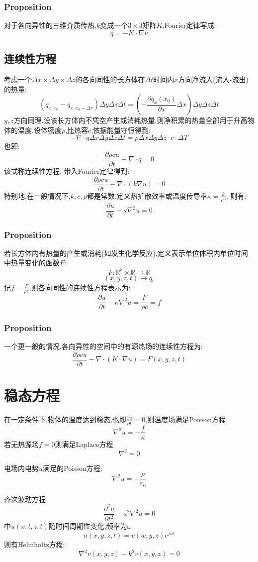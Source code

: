 \documentclass[12pt, a4paper, oneside]{ctexbook}
\newcommand{\pian }{\partial}%
\newcommand{\R }{\mathbb{R}}%
\begin{document}
\subsubsection{Proposition}
对于各向异性的三维介质传热,$k$变成一个$3\times 3$矩阵$K$,Fourier定律写成:
$$
q=-K\cdot \nabla u
$$
\subsection{连续性方程}
考虑一个$\Delta x\times \Delta y\times \Delta z$的各向同性的长方体在$\Delta t$时间内$x$方向净流入(流入-流出)的热量:
$$
  (q_{x,x_0}-q_{x,x_0+\Delta x})\Delta y\Delta z \Delta t=(-\frac{\pian q_x(x_0)}{\pian x}\Delta x )\Delta y \Delta z \Delta t
$$
$y,z$方向同理.设该长方体内不凭空产生或消耗热量,则净积累的热量全部用于升高物体的温度.设体密度$\rho$,比热容$c$,依据能量守恒得到:
$$
  -\nabla \cdot q \Delta x\Delta y \Delta z \Delta t=\rho \Delta x\Delta y \Delta z\cdot c\cdot \Delta T
$$
也即:
$$
  \frac{\pian \rho c u}{\pian t}+\nabla \cdot q=0
$$
该式称连续性方程.
带入Fourier定律得到:
$$
  \frac{\pian \rho c u}{\pian t}-\nabla \cdot (k\nabla u)=0
$$
特别地,在一般情况下,$k,c,\rho$都是常数.定义热扩散效率或温度传导率$\kappa =\frac{k}{\rho c}$,
则有:
$$
  \frac{\pian u}{\pian t}-\kappa\nabla^2 u=0
$$
\subsubsection{Proposition}
若长方体内有热量的产生或消耗(如发生化学反应),定义表示单位体积内单位时间中热量变化的函数$F$:
$$
  F:\R^3\times \R\rightarrow \R
$$
$$
  (x,y,z,t)\mapsto q_r
$$
记$f=\frac{F}{\rho c}$,则各向同性的连续性方程表示为:
$$
  \frac{\pian u}{\pian t}-\kappa\nabla^2 u=\frac{F}{\rho c}=f
$$
\subsubsection{Proposition}
一个更一般的情况,各向异性的空间中的有源热场的连续性方程为:
$$
  \frac{\pian \rho c u}{\pian t}-\nabla \cdot (K\cdot \nabla u)=F(x,y,z,t)
$$
\section{稳态方程}
在一定条件下,物体的温度达到稳态,也即$\frac{\pian u}{\pian t}=0$,则温度场满足Poisson方程
$$
  \nabla^2u=-\frac{f}{\kappa}
$$
若无热源场$f=0$则满足Laplace方程
$$
  \nabla^2=0
$$

电场内电势$u$满足的Poisson方程:
$$
  \nabla^2u=-\frac{\rho }{\varepsilon_0}
$$

齐次波动方程
$$
    \frac{\pian^2 u}{\pian t^2}-a^2\nabla^2 u=0
$$
中$u(x,t,z,t)$随时间周期性变化,频率为$\omega$
$$
  u(x,y,z,t)=v(w,y,z)e^{j\omega t}
$$
则有Helmholtz方程:
$$
  \nabla^2v(x,y,z)+k^2v(x,y,z)=0
$$
\end{document}
